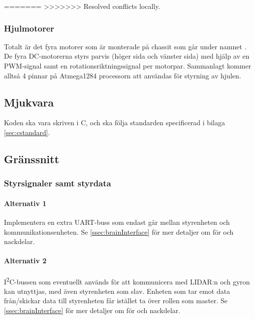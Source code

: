 \documentclass[a4paper,11pt]{article}
\begin{document}

=======
>>>>>>> Resolved conflicts locally.

\subsubsection{Hjulmotorer}
Totalt är det fyra motorer som är monterade på chassit som går under namnet \cite{terminator}. De fyra DC-motorerna styrs parvis (höger sida och vänster sida) med hjälp av en PWM-signal samt en rotationsriktningssignal per motorpar. Sammanlagt kommer alltså 4 pinnar på Atmega1284 processorn att användas för styrning av hjulen.

\subsection{Mjukvara}

Koden ska vara skriven i C, och ska följa standarden specificerad i bilaga \ref{sec:cstandard}.

\subsection{Gränssnitt} \label{ssec:controllInterface}

\subsubsection{Styrsignaler samt styrdata}

\paragraph{Alternativ 1}
Implementera en extra UART-buss som endast går mellan styrenheten och kommunikationsenheten. Se \ref{ssec:brainInterface} för mer detaljer om för och nackdelar.

\paragraph{Alternativ 2}
I\textsuperscript{2}C-bussen som eventuellt används för att kommunicera med LIDAR:n och gyron kan utnyttjas, med även styrenheten som slav. Enheten som tar emot data från/skickar data till styrenheten får istället ta över rollen som master. Se \ref{ssec:brainInterface} för mer detaljer om för och nackdelar.
\end{document}
